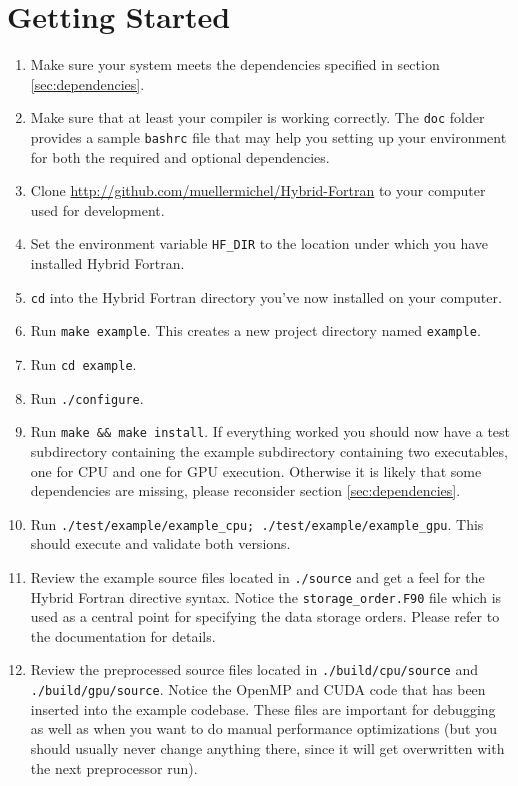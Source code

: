 \section{Getting Started}
\begin{enumerate}
 \item Make sure your system meets the dependencies specified in section \ref{sec:dependencies}.
 \item Make sure that at least your compiler is working correctly. The \verb|doc| folder provides a sample \verb|bashrc| file that may help you setting up your environment for both the required and optional dependencies.
 \item Clone \url{http://github.com/muellermichel/Hybrid-Fortran} to your computer used for development.
 \item Set the environment variable \verb|HF_DIR| to the location under which you have installed Hybrid Fortran.
 \item \verb|cd| into the Hybrid Fortran directory you've now installed on your computer.
 \item Run \verb|make example|. This creates a new project directory named \verb|example|.
 \item Run \verb|cd example|.
 \item Run \verb|./configure|.
 \item Run \verb|make && make install|. If everything worked you should now have a test subdirectory containing the example subdirectory containing two executables, one for CPU and one for GPU execution. Otherwise it is likely that some dependencies are missing, please reconsider section \ref{sec:dependencies}.
 \item Run \verb|./test/example/example_cpu; ./test/example/example_gpu|. This should execute and validate both versions.
 \item Review the example source files located in \verb|./source| and get a feel for the Hybrid Fortran directive syntax. Notice the \verb|storage_order.F90| file which is used as a central point for specifying the data storage orders. Please refer to the documentation for details.
 \item Review the preprocessed source files located in \verb|./build/cpu/source| and \verb|./build/gpu/source|. Notice the OpenMP and CUDA code that has been inserted into the example codebase. These files are important for debugging as well as when you want to do manual performance optimizations (but you should usually never change anything there, since it will get overwritten with the next preprocessor run).

\end{enumerate}
